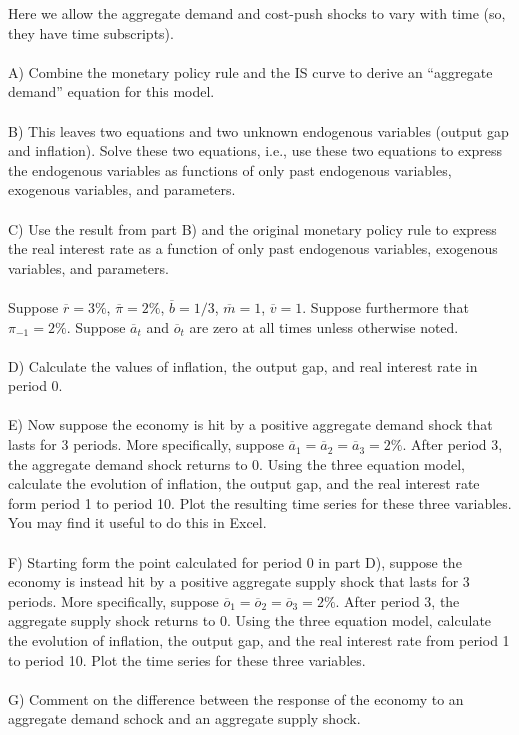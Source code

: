 \begin{homeworkProblem}[2]
    Here we allow the aggregate demand and cost-push shocks to vary with time (so,
    they have time subscripts).
    \\ \\
    A) Combine the monetary policy rule and the IS curve to derive an ``aggregate
    demand'' equation for this model.
    \\ \\
    B) This leaves two equations and two unknown endogenous variables (output gap and
    inflation). Solve these two equations, i.e., use these two equations to express the
    endogenous variables as functions of only past endogenous variables, exogenous variables,
    and parameters. 
    \\ \\
    C) Use the result from part B) and the original monetary policy rule to express the real
    interest rate as a function of only past endogenous variables, exogenous variables, and
    parameters. 
    \\ \\
    Suppose $\overline{r} = 3\%$, $\overline{\pi} = 2\%$, $\overline{b}=1/3$, $\overline{m} =
    1$, $\overline{v}=1$. Suppose furthermore that $\pi_{-1} = 2\%$. Suppose $\overline{a}_t$
    and $\overline{o}_t$ are zero at all times unless otherwise noted. 
    \\ \\
    D) Calculate the values of inflation, the output gap, and real interest rate in period 0.
    \\ \\
    E) Now suppose the economy is hit by a positive aggregate demand shock that lasts for 3 
    periods. More specifically, suppose $\overline{a}_1 = \overline{a}_2 = \overline{a}_3 = 2\%$.
    After period 3, the aggregate demand shock returns to 0. Using the three equation model,
    calculate the evolution of inflation, the output gap, and the real interest rate form period
    1 to period 10. Plot the resulting time series for these three variables. You may find it useful
    to do this in Excel.
    \\ \\
    F) Starting form the point calculated for period 0 in part D), suppose the economy is instead
    hit by a positive aggregate supply shock that lasts for 3 periods. More specifically, suppose
    $\overline{o}_1 = \overline{o}_2 = \overline{o}_3 = 2\%$. After period 3, the aggregate supply
    shock returns to 0. Using the three equation model, calculate the evolution of inflation, the
    output gap, and the real interest rate from period 1 to period 10. Plot the time series for 
    these three variables. 
    \\ \\
    G) Comment on the difference between the response of the economy to an aggregate demand schock
    and an aggregate supply shock.
    
    \pagebreak
    
\end{homeworkProblem}